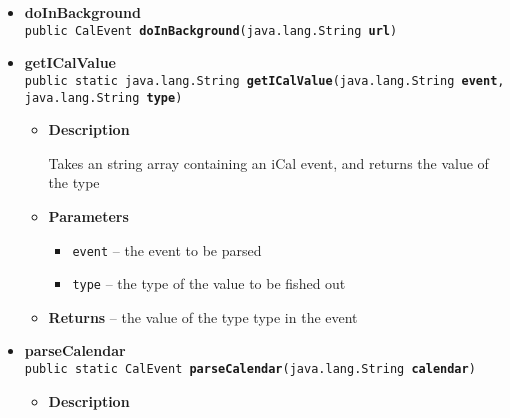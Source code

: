\documentclass[11pt,a4paper]{report}
\begin{document}
{{{\begin{itemize}
{\begin{itemize}
{Takes an iCal calendar string, and returns an array of string arrays each containing an event
}
\item{
{\bf  Parameters}
  \begin{itemize}
   \item{
\texttt{calendar} -- a string that contains an iCal calendar}
  \end{itemize}
}%
\item{{\bf  Returns} -- 
an array of the events in the iCal calendar calendar. 
}%
\end{itemize}
}%
\item{ 
{\bf  doInBackground}\\
\texttt{public CalEvent\lbrack \rbrack \ {\bf  doInBackground}(\texttt{java.lang.String\lbrack \rbrack } {\bf  url})
\label{is.mpg.ruglan.iCalParser.doInBackground(java.lang.String[])}}%
}%
\item{ 
{\bf  getICalValue}\\
\texttt{public static java.lang.String\ {\bf  getICalValue}(\texttt{java.lang.String\lbrack \rbrack } {\bf  event},
\texttt{java.lang.String} {\bf  type})
\label{is.mpg.ruglan.iCalParser.getICalValue(java.lang.String[], java.lang.String)}}%
\begin{itemize}
\item{
{\bf  Description}

Takes an string array containing an iCal event, and returns the value of the type
}
\item{
{\bf  Parameters}
  \begin{itemize}
   \item{
\texttt{event} -- the event to be parsed}
   \item{
\texttt{type} -- the type of the value to be fished out}
  \end{itemize}
}%
\item{{\bf  Returns} -- 
the value of the type type in the event 
}%
\end{itemize}
}%
\item{ 
{\bf  parseCalendar}\\
\texttt{public static CalEvent\lbrack \rbrack \ {\bf  parseCalendar}(\texttt{java.lang.String} {\bf  calendar})
\label{is.mpg.ruglan.iCalParser.parseCalendar(java.lang.String)}}%
\begin{itemize}
\item{
{\bf  Description}

}
\end{itemize}}
\end{itemize}}}}
\end{document}
